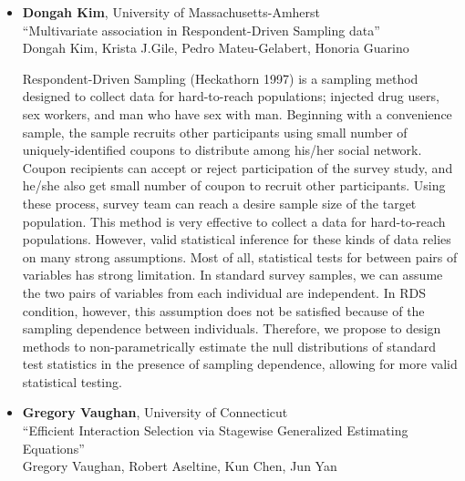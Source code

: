 \begin{itemize}
\item \textbf{Dongah Kim}, University of Massachusetts-Amherst \\
``Multivariate association in Respondent-Driven Sampling data'' \\
Dongah Kim, Krista J.Gile, Pedro Mateu-Gelabert, Honoria Guarino


Respondent-Driven Sampling (Heckathorn 1997) is a sampling method designed to collect data for hard-to-reach populations; injected drug users, sex workers, and man who have sex with man. Beginning with a convenience sample, the sample recruits other participants using small number of uniquely-identified coupons to distribute among his/her social network. Coupon recipients can accept or reject participation of the survey study, and he/she also get small number of coupon to recruit other participants. Using these process, survey team can reach a desire sample size of the target population.
This method is very effective to collect a data for hard-to-reach populations. However, valid statistical inference for these kinds of data relies on many strong assumptions. Most of all, statistical tests for between pairs of variables has strong limitation. In standard survey samples, we can assume the two pairs of variables from each individual are independent. In RDS condition, however, this assumption does not be satisfied because of the sampling dependence between individuals. Therefore, we propose to design methods to non-parametrically estimate the null distributions of standard test statistics in the presence of sampling dependence, allowing for more valid statistical testing.

\item \textbf{Gregory Vaughan}, University of Connecticut \\
``Efficient Interaction Selection via Stagewise Generalized Estimating Equations'' \\
Gregory Vaughan, Robert Aseltine, Kun Chen, Jun Yan



\end{itemize}
